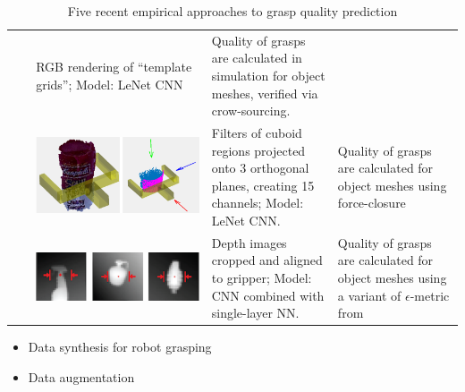 \documentclass[runningheads]{../llncs}
\begin{document}
\begin{table}[h!]
\begin{tabularx}{\linewidth}{L{0.05\linewidth}C{0.39\linewidth}L{0.28\linewidth}L{0.28\linewidth}}
        & RGB rendering of ``template grids''; \linebreak Model: LeNet CNN
        & Quality of grasps are \linebreak calculated in simulation \linebreak for object
        meshes, \linebreak verified via crow-sourcing. \\
        \cite{Gualtieri2016}& \includegraphics[scale=0.1,valign=t]{Gualtieri_et_al-2016-grasp_representation}
        & Filters of cuboid regions projected onto 3 orthogonal planes, creating 15 channels;
        \linebreak Model: LeNet CNN.
        & Quality of grasps are \linebreak calculated for object \linebreak meshes using
        force-closure \\
        \cite{mahler2017}   & \includegraphics[scale=0.22,valign=t]{mahler_et_al-2017-grasp_representation}
        & Depth images cropped and aligned to gripper; \linebreak Model: CNN combined
        with single-layer NN.
        & Quality of grasps are \linebreak calculated for object \linebreak meshes using a
        variant of $ \epsilon $-metric from \cite{WeiszAllen2012} \\
        \bottomrule
    \end{tabularx}
    \caption{\scriptsize Five recent empirical approaches to grasp quality prediction}
    \label{table:grasp_approaches}
\end{table}
\begin{itemize}
    \item Data synthesis for robot grasping
    \item Data augmentation
\end{itemize}
\end{document}
